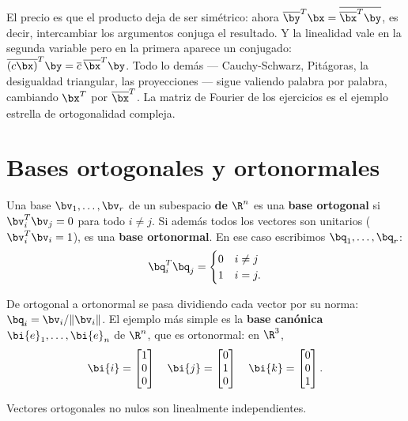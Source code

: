 El precio es que el producto deja de ser simétrico: ahora
$\overline{\by}^T\bx=\overline{\overline{\bx}^T\by}$, es decir, intercambiar
los argumentos conjuga el resultado. Y la linealidad vale en la segunda
variable pero en la primera aparece un conjugado:
$\overline{(c\bx)}^T\by=\overline{c}\,\overline{\bx}^T\by$. Todo lo demás ---
Cauchy-Schwarz, Pitágoras, la desigualdad triangular, las proyecciones ---
sigue valiendo palabra por palabra, cambiando $\bx^T$ por $\overline{\bx}^T$.
La matriz de Fourier de los ejercicios es el ejemplo estrella de ortogonalidad
compleja.


\section{Bases ortogonales y ortonormales}

\begin{definicion}
Una base $\bv_1,\dots,\bv_r$ de un subespacio \textbf{de} $\R^n$ es una \textbf{base ortogonal}
si $\bv_i^T\bv_j=0$ para todo $i\ne j$. Si además todos los vectores son
unitarios ($\bv_i^T\bv_i=1$), es una \textbf{base ortonormal}. En ese
caso escribimos $\bq_1,\dots,\bq_r$:
\[
\bq_i^T\bq_j=\begin{cases}0 & i\ne j\\ 1 & i=j.\end{cases}
\]
\end{definicion}

De ortogonal a ortonormal se pasa dividiendo cada vector por su norma:
$\bq_i=\bv_i/\|\bv_i\|$. El ejemplo más simple es la \textbf{base canónica}
$\bi{e}_1,\dots,\bi{e}_n$ de $\R^n$, que es ortonormal: en $\R^3$,
\[
\bi{i}=\begin{bmatrix}1\\0\\0\end{bmatrix}\quad
\bi{j}=\begin{bmatrix}0\\1\\0\end{bmatrix}\quad
\bi{k}=\begin{bmatrix}0\\0\\1\end{bmatrix}.
\]

\begin{proposicion}\label{prop:ort-indep}
Vectores ortogonales no nulos son linealmente independientes.
\end{proposicion}

